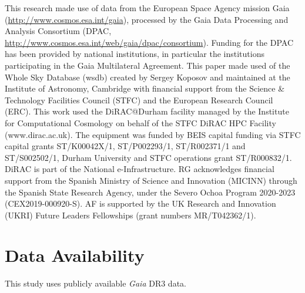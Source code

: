 \documentclass[a4paper,useAMS,usenatbib]{mnras}
\begin{document}
This research made use of data from the European Space Agency mission Gaia
(\url{http://www.cosmos.esa.int/gaia}), processed by the Gaia Data
Processing and Analysis Consortium (DPAC,
\url{http://www.cosmos.esa.int/web/gaia/dpac/consortium}). Funding for the
DPAC has been provided by national institutions, in particular the
institutions participating in the Gaia Multilateral Agreement. This
paper made used of the Whole Sky Database (wsdb) created by Sergey
Koposov and maintained at the Institute of Astronomy, Cambridge with
financial support from the Science \& Technology Facilities Council (STFC) and the European Research Council (ERC). This work used the DiRAC@Durham facility managed by the
Institute for Computational Cosmology on behalf of the STFC DiRAC HPC Facility (www.dirac.ac.uk). The equipment was funded by BEIS capital funding via STFC capital grants ST/K00042X/1, ST/P002293/1, ST/R002371/1 and ST/S002502/1, Durham University and STFC operations
grant ST/R000832/1. DiRAC is part of the National e-Infrastructure. 
RG acknowledges financial support from the Spanish Ministry of Science and Innovation (MICINN) through the Spanish State Research Agency, under the Severo Ochoa Program 2020-2023 (CEX2019-000920-S). AF is supported by
the UK Research and Innovation (UKRI) Future Leaders Fellowships (grant numbers MR/T042362/1).

\section*{Data Availability}

This study uses publicly available {\it Gaia} DR3 data.



\appendix

\label{lastpage}
\end{document}
